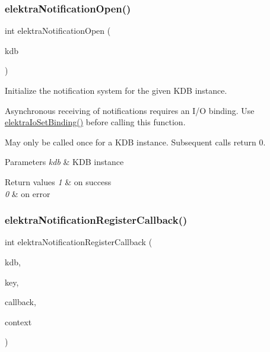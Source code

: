 \subsubsection{\texorpdfstring{elektra\+Notification\+Open()}{elektraNotificationOpen()}}
{\footnotesize\ttfamily int elektra\+Notification\+Open (\begin{DoxyParamCaption}\item[{K\+DB $\ast$}]{kdb }\end{DoxyParamCaption})}



Initialize the notification system for the given K\+DB instance. 

Asynchronous receiving of notifications requires an I/O binding. Use \hyperlink{group__kdbio_ga187345483bdfbb404919c6797bc2db77}{elektra\+Io\+Set\+Binding()} before calling this function.

May only be called once for a K\+DB instance. Subsequent calls return 0.


\begin{DoxyParams}{Parameters}
{\em kdb} & K\+DB instance \\
\hline
\end{DoxyParams}

\begin{DoxyRetVals}{Return values}
{\em 1} & on success \\
\hline
{\em 0} & on error \\
\hline
\end{DoxyRetVals}
\mbox{\label{group__kdbnotification_gab42738703162b3769b1336dcade47b18}} 
\subsubsection{\texorpdfstring{elektra\+Notification\+Register\+Callback()}{elektraNotificationRegisterCallback()}}
{\footnotesize\ttfamily int elektra\+Notification\+Register\+Callback (\begin{DoxyParamCaption}\item[{K\+DB $\ast$}]{kdb,  }\item[{Key $\ast$}]{key,  }\item[{\hyperlink{group__kdbnotification_gad0d800e32a72d89780321e5723301eb9}{Elektra\+Notification\+Change\+Callback}}]{callback,  }\item[{void $\ast$}]{context }\end{DoxyParamCaption})}



